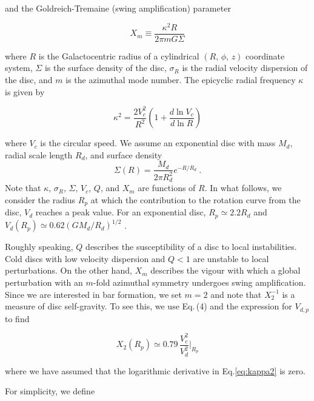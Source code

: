 \noindent and the Goldreich-Tremaine (swing amplification) parameter
\citep{GoldreichTremaine1978, GoldreichTremaine1979}

\begin{equation} \label{eq:xm}
X_m \equiv \frac{\kappa^2 R}{2\pi m G\Sigma}
\end{equation}

\noindent where $R$ is the Galactocentric radius of a cylindrical
$\left (R,\,\phi,\,z\right )$ coordinate system, $\Sigma$ is the
surface density of the disc, $\sigma_R$ is the radial velocity
dispersion of the disc, and $m$ is the azimuthal mode number.  The
epicyclic radial frequency $\kappa$ is given by

\begin{equation} \label{eq:kappa2}
\kappa^2 = \frac{2V_c^2}{R^2}\left (1 + \frac{d\ln{V_c}}{d\ln R}\right )
\end{equation}

\noindent where $V_c$ is the circular speed.  We assume an exponential
disc with mass $M_d$, radial scale length $R_d$, and surface density
\begin{equation} \label{eq:sigma}
\Sigma(R) = \frac{M_d}{2\pi R_d^2} e^{-R/R_d}~.
\end{equation}
\noindent Note that $\kappa$, $\sigma_R$, $\Sigma$, $V_c$, $Q$, and
$X_m$ are functions of $R$.  In what follows, we consider the radius
$R_p$ at which the contribution to the rotation curve from the disc,
$V_d$ reaches a peak value.  For an exponential disc, $R_p \simeq
2.2R_d$ and $V_{d}(R_p) \simeq 0.62 \left (GM_d/R_d\right )^{1/2}$
\citep{BT}.

Roughly speaking, $Q$ describes the susceptibility of a disc to local
instabilities.  Cold discs with low velocity dispersion and $Q<1$ are
unstable to local perturbations.  On the other hand, $X_m$ describes
the vigour with which a global perturbation with an $m$-fold azimuthal
symmetry undergoes swing amplification.  Since we are interested in
bar formation, we set $m=2$ and note that $X_2^{-1}$ is a measure of
disc self-gravity.  To see this, we use Eq.\,(4) and the expression
for $V_{d,p}$ to find

\begin{equation} \label{eq:x2}
X_2(R_p) \simeq  0.79\,\frac{V_c^2}{V_d^2}\Biggr\rvert_{R_p}
\end{equation}

\noindent where we have assumed that the logarithmic derivative in
Eq.\eqref{eq:kappa2} is zero.

For simplicity, we define

